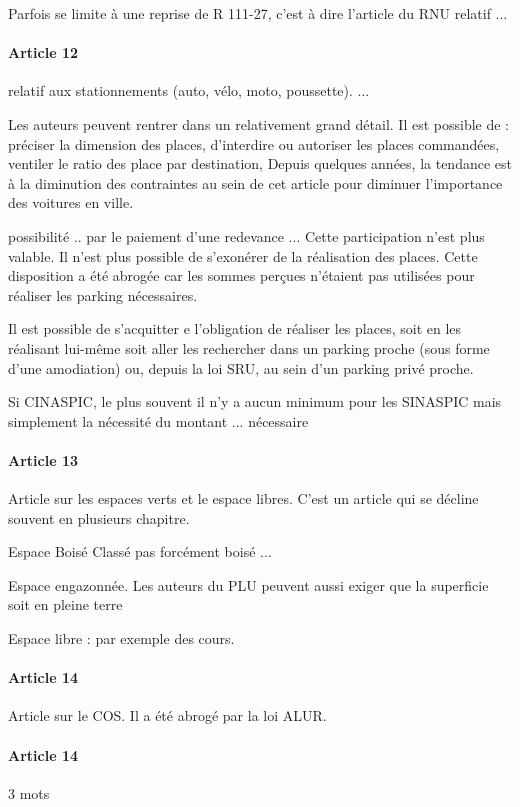 			Parfois se limite à une reprise de R 111-27, c'est à dire l'article du RNU relatif ...

			\paragraph{Article 12} relatif aux stationnements (auto, vélo, moto, poussette).  ...

			Les auteurs peuvent rentrer dans un relativement grand détail. Il est possible de : préciser la dimension des places, d'interdire ou autoriser les places commandées, ventiler le ratio des place par destination, \etc Depuis quelques années, la tendance est à la diminution des contraintes au sein de cet article pour diminuer l'importance des voitures en ville.

			possibilité .. par le paiement d'une redevance ... Cette participation n'est plus valable. Il n'est plus possible de s'exonérer de la réalisation des places. Cette disposition a été abrogée car les sommes perçues n'étaient pas utilisées pour réaliser les parking nécessaires.

			Il est possible de s'acquitter e l'obligation de réaliser les places, soit en les réalisant lui-même soit aller les rechercher dans un parking proche (sous forme d'une amodiation) ou, depuis la loi SRU, au sein d'un parking privé proche.

			Si CINASPIC, le plus souvent il n'y a aucun minimum pour les SINASPIC mais simplement la nécessité du montant ... nécessaire

			\paragraph{Article 13}  Article sur les espaces verts et le espace libres. C'est un article qui se décline souvent en plusieurs chapitre.

			Espace Boisé Classé pas forcément boisé ...

			Espace engazonnée. Les auteurs du PLU peuvent aussi exiger que la superficie soit en pleine terre

			Espace libre : par exemple des cours.

			\paragraph{Article 14} Article sur le COS. Il a été abrogé par la loi ALUR.

			\paragraph{Article 14} 3 mots

